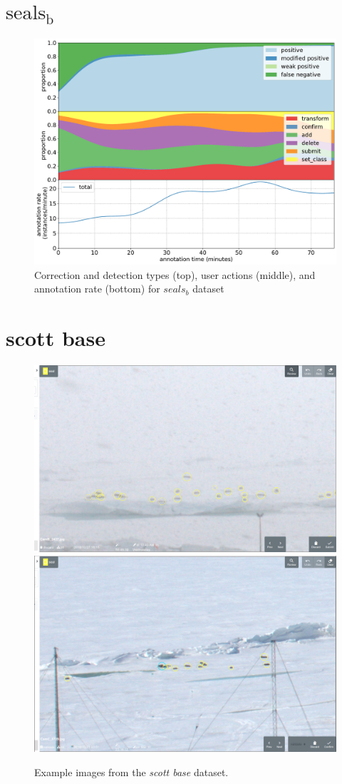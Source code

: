 \pagebreak
\section {\texorpdfstring{$\mathrm{seals_b}$}{}}
\label{sec:seals2_details}

\begin{figure}[!h]
\centering
\includegraphics[width=1.0\linewidth]{charts/action_annotations/seals2.pdf}
\caption{ Correction and detection types (top), user actions (middle), and annotation rate (bottom) for $seals_b$ dataset }
\label{fig:seals2_annotation}
\end{figure}

\pagebreak
\section {scott base}
\label{sec:scott_base_details}


\begin{figure}[!h]
\centering
  \includegraphics[width=0.475\linewidth]{figures/annotation/screenshots/scott_base_storm.png}
  \hfill
  \includegraphics[width=0.45\linewidth]{figures/annotation/screenshots/scott_base_sunny.png}
  \caption{}
\caption{ Example images from the \emph{scott base} dataset.}
\label {fig:scott_base_examples}
\end{figure}

